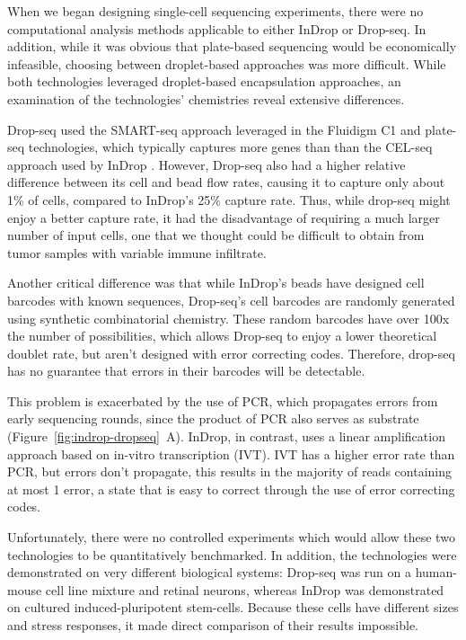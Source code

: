 When we began designing single-cell sequencing experiments, there were no computational analysis methods applicable to either InDrop or Drop-seq. 
In addition, while it was obvious that plate-based sequencing would be economically infeasible, choosing between droplet-based approaches was more difficult. 
While both technologies leveraged droplet-based encapsulation approaches, an examination of the technologies' chemistries reveal extensive differences. 

Drop-seq used the SMART-seq approach leveraged in the Fluidigm C1 and plate-seq technologies, which typically captures more genes than than the CEL-seq approach used by InDrop \citep{Ziegenhain2017}. 
However, Drop-seq also had a higher relative difference between its cell and bead flow rates, causing it to capture only about 1\% of cells, compared to InDrop’s 25\% capture rate. 
Thus, while drop-seq might enjoy a better capture rate, it had the disadvantage of requiring a much larger number of input cells, one that we thought could be difficult to obtain from tumor samples with variable immune infiltrate. 

Another critical difference was that while InDrop’s beads have designed cell barcodes with known sequences, Drop-seq’s cell barcodes are randomly generated using synthetic combinatorial chemistry. 
These random barcodes have over 100x the number of possibilities, which allows Drop-seq to enjoy a lower theoretical doublet rate, but aren't designed with error correcting codes. 
Therefore, drop-seq has no guarantee that errors in their barcodes will be detectable. 

This problem is exacerbated by the use of PCR, which propagates errors from early sequencing rounds, since the product of PCR also serves as substrate (Figure~\ref{fig:indrop-dropseq}~A). 
InDrop, in contrast, uses a linear amplification approach based on in-vitro transcription (IVT).
IVT has a higher error rate than PCR, but errors don't propagate, this results in the majority of reads containing at most 1 error, a state that is easy to correct through the use of error correcting codes. 

Unfortunately, there were no controlled experiments which would allow these two technologies to be quantitatively benchmarked. 
In addition, the technologies were demonstrated on very different biological systems: 
Drop-seq was run on a human-mouse cell line mixture and retinal neurons, whereas InDrop was demonstrated on cultured induced-pluripotent stem-cells. 
Because these cells have different sizes and stress responses, it made direct comparison of their results impossible. 

